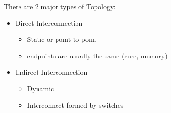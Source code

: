 \documentclass{article}
\begin{document}
There are 2 major types of Topology:
\begin{itemize}
    \item Direct Interconnection
          \begin{itemize}
              \item Static or point-to-point
              \item endpoints are usually the same (core, memory)
          \end{itemize}
    \item Indirect Interconnection
          \begin{itemize}
              \item Dynamic
              \item Interconnect formed by switches
          \end{itemize}
\end{itemize}
\end{document}
